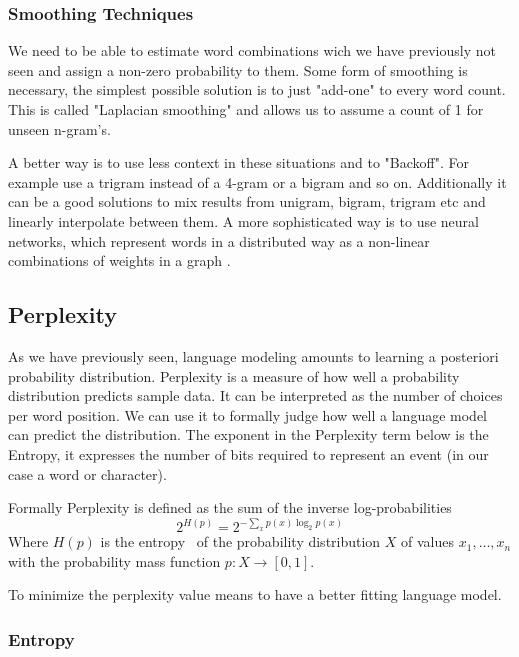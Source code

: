 \subsubsection{Smoothing Techniques}

We need to be able to estimate word combinations wich we have previously not seen and assign a non-zero probability to them.
Some form of smoothing is necessary, the simplest possible solution is to just "add-one" to every word count.
This is called "Laplacian smoothing" and allows us to assume a count of 1 for unseen n-gram's. 

A better way is to use less context in these situations and to "Backoff". For example use a trigram instead of a 4-gram or a bigram and so on.
Additionally it can be a good solutions to mix results from unigram, bigram, trigram etc and linearly interpolate between them.
A more sophisticated way is to use neural networks, which represent words in a distributed way as 
a non-linear combinations of weights in a graph \cite{Hinton:1986:DR:104279.104287}.


\subsection{Perplexity}
\label{subsec:perplexity}

As we have previously seen, language modeling amounts to learning a posteriori probability distribution. 
Perplexity is a measure of how well a probability distribution predicts sample data. It can be 
interpreted as the number of choices per word position.
We can use it to formally judge how well a language model can predict the distribution. The exponent in the Perplexity term below
is the Entropy, it expresses the number of bits required to represent an event (in our case a word or character).

Formally Perplexity is defined as the sum of the inverse log-probabilities
\[
    2^{H(p)}=2^{-\sum_x p(x)\log_2 p(x)}
\]
Where $H(p)$ is the entropy~\cite{Shannon:1948} of the probability 
distribution $X$ of values ${x_1,\dots,x_n}$ with the probability mass function $p: X \rightarrow [0,1]$.

To minimize the perplexity value means to have a better fitting language model.

\subsubsection{Entropy}

